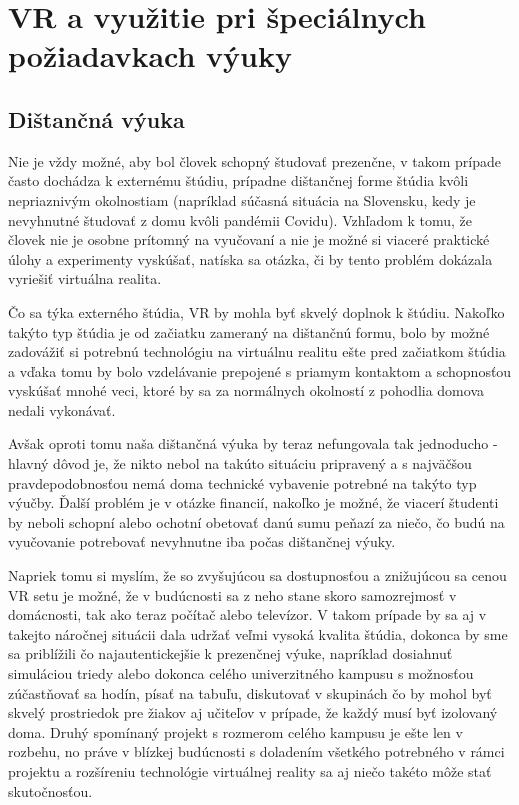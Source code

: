 \documentclass[10pt,twoside,slovak,a4paper]{article}
\begin{document}
\section{VR a využitie pri špeciálnych požiadavkach výuky} \label{stvrta}

\subsection{Dištančná výuka} \label{pomoc}
Nie je vždy možné, aby bol človek schopný študovať prezenčne, v takom prípade často dochádza k externému štúdiu, prípadne dištančnej forme štúdia kvôli nepriaznivým okolnostiam (napríklad súčasná situácia na Slovensku, kedy je nevyhnutné študovať z domu kvôli pandémii Covidu). Vzhľadom k tomu, že človek nie je osobne prítomný na vyučovaní a nie je možné si viaceré praktické úlohy a experimenty vyskúšať, natíska sa otázka, či by tento problém dokázala vyriešiť virtuálna realita.

Čo sa týka externého štúdia, VR by mohla byť skvelý doplnok k štúdiu. Nakoľko takýto typ štúdia je od začiatku zameraný na dištančnú formu, bolo by možné zadovážiť si potrebnú technológiu na virtuálnu realitu ešte pred začiatkom štúdia a vďaka tomu by bolo vzdelávanie prepojené s priamym kontaktom a schopnosťou vyskúšať mnohé veci, ktoré by sa za normálnych okolností z pohodlia domova nedali vykonávať.

Avšak oproti tomu naša dištančná výuka by teraz nefungovala tak jednoducho - hlavný dôvod je, že nikto nebol na takúto situáciu pripravený a s najväčšou pravdepodobnosťou nemá doma technické vybavenie potrebné na takýto typ výučby. Ďalší problém je v otázke financií, nakoľko je možné, že viacerí študenti by neboli schopní alebo ochotní obetovať danú sumu peňazí za niečo, čo budú na vyučovanie potrebovať nevyhnutne iba počas dištančnej výuky. 

Napriek tomu si myslím, že so zvyšujúcou sa dostupnosťou a znižujúcou sa cenou VR setu je možné, že v budúcnosti sa z neho stane skoro samozrejmosť v domácnosti, tak ako teraz počítač alebo televízor. V takom prípade by sa aj v takejto náročnej situácii dala udržať veľmi vysoká kvalita štúdia, dokonca by sme sa priblížili čo najautentickejšie k prezenčnej výuke, napríklad dosiahnuť simuláciou triedy \cite{trieda} alebo dokonca celého univerzitného kampusu \cite{distancne} s možnosťou zúčastňovať sa hodín, písať na tabuľu, diskutovať v skupinách čo by mohol byť skvelý prostriedok pre žiakov aj učiteľov v prípade, že každý musí byť izolovaný doma. Druhý spomínaný projekt s rozmerom celého kampusu je ešte len v rozbehu, no práve v blízkej budúcnosti s doladením všetkého potrebného v rámci projektu a rozšíreniu technológie virtuálnej reality sa aj niečo takéto môže stať skutočnosťou.
\end{document}
